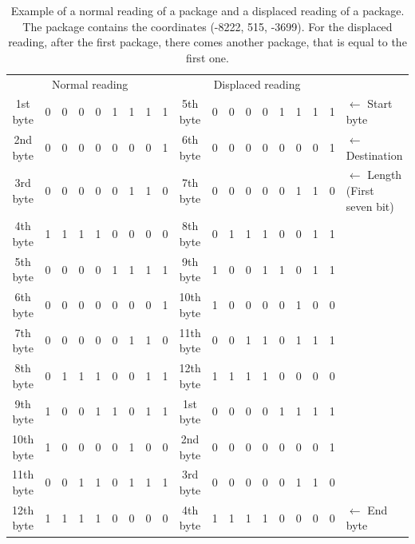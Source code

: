 \begin{table}[H]
\centering
\begin{tabular}{c | m{0.1cm} m{0.1cm} m{0.1cm} m{0.1cm} m{0.1cm} m{0.1cm} m{0.1cm} m{0.1cm} | c | m{0.1cm} m{0.1cm} m{0.1cm} m{0.1cm} m{0.1cm} m{0.1cm} m{0.1cm} m{0.1cm} | l }
\multicolumn{9}{c}{Normal reading} & \multicolumn{9}{c}{Displaced reading} &  \\
\cline{2-9} \cline{11-18}
1st byte & 0 & 0 & 0 & 0 & 1 & 1 & 1 & 1 & 5th byte & 0 & 0 & 0 & 0 & 1 & 1 & 1 & 1 & $\leftarrow$ Start byte \\
\cline{2-9} \cline{11-18}
2nd byte & 0 & 0 & 0 & 0 & 0 & 0 & 0 & 1 & 6th byte & 0 & 0 & 0 & 0 & 0 & 0 & 0 & 1 & $\leftarrow$ Destination \\
\cline{2-9} \cline{11-18}
3rd byte & 0 & 0 & 0 & 0 & 0 & 1 & 1 & 0 & 7th byte & 0 & 0 & 0 & 0 & 0 & 1 & 1 & 0 & $\leftarrow$ Length (First seven bit)\\
\cline{2-9} \cline{11-18}
4th byte & 1 & 1 & 1 & 1 & 0 & 0 & 0 & 0 & 8th byte & 0 & 1 & 1 & 1 & 0 & 0 & 1 & 1 & \\
\cline{2-9} \cline{11-18}
5th byte & 0 & 0 & 0 & 0 & 1 & 1 & 1 & 1 & 9th byte & 1 & 0 & 0 & 1 & 1 & 0 & 1 & 1 & \\
\cline{2-9} \cline{11-18}
6th byte & 0 & 0 & 0 & 0 & 0 & 0 & 0 & 1 & 10th byte & 1 & 0 & 0 & 0 & 0 & 1 & 0 & 0 & \\
\cline{2-9} \cline{11-18}
7th byte & 0 & 0 & 0 & 0 & 0 & 1 & 1 & 0 & 11th byte & 0 & 0 & 1 & 1 & 0 & 1 & 1 & 1 & \\
\cline{2-9} \cline{11-18}
8th byte & 0 & 1 & 1 & 1 & 0 & 0 & 1 & 1 & 12th byte & 1 & 1 & 1 & 1 & 0 & 0 & 0 & 0 & \\
\cline{2-9} \cline{11-18}
9th byte & 1 & 0 & 0 & 1 & 1 & 0 & 1 & 1 & 1st byte & 0 & 0 & 0 & 0 & 1 & 1 & 1 & 1 & \\
\cline{2-9} \cline{11-18}
10th byte & 1 & 0 & 0 & 0 & 0 & 1 & 0 & 0 & 2nd byte & 0 & 0 & 0 & 0 & 0 & 0 & 0 & 1 & \\
\cline{2-9} \cline{11-18}
11th byte & 0 & 0 & 1 & 1 & 0 & 1 & 1 & 1 & 3rd byte & 0 & 0 & 0 & 0 & 0 & 1 & 1 & 0 & \\
\cline{2-9} \cline{11-18}
12th byte & 1 & 1 & 1 & 1 & 0 & 0 & 0 & 0 & 4th byte & 1 & 1 & 1 & 1 & 0 & 0 & 0 & 0 & $\leftarrow$ End byte\\
\cline{2-9} \cline{11-18}
\end{tabular}
\caption{Example of a normal reading of a package and a displaced reading of a package. The package contains the coordinates (-8222, 515, -3699). For the displaced reading, after the first package, there comes another package, that is equal to the first one.}
\label{errorPro}
\end{table}

